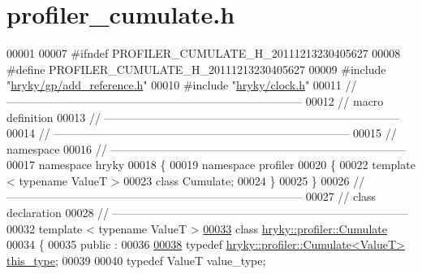 \hypertarget{profiler__cumulate_8h_source}{\section{profiler\-\_\-cumulate.\-h}
}

\begin{DoxyCode}
00001 
00007 \textcolor{preprocessor}{#ifndef PROFILER\_CUMULATE\_H\_20111213230405627}
00008 \textcolor{preprocessor}{}\textcolor{preprocessor}{#define PROFILER\_CUMULATE\_H\_20111213230405627}
00009 \textcolor{preprocessor}{}\textcolor{preprocessor}{#include "\hyperlink{add__reference_8h}{hryky/gp/add_reference.h}"}
00010 \textcolor{preprocessor}{#include "\hyperlink{clock_8h}{hryky/clock.h}"}
00011 \textcolor{comment}{//
      ------------------------------------------------------------------------------}
00012 \textcolor{comment}{// macro definition}
00013 \textcolor{comment}{//
      ------------------------------------------------------------------------------}
00014 \textcolor{comment}{//
      ------------------------------------------------------------------------------}
00015 \textcolor{comment}{// namespace}
00016 \textcolor{comment}{//
      ------------------------------------------------------------------------------}
00017 \textcolor{keyword}{namespace }hryky
00018 \{
00019 \textcolor{keyword}{namespace }profiler
00020 \{
00022     \textcolor{keyword}{template} < \textcolor{keyword}{typename} ValueT >
00023     \textcolor{keyword}{class }Cumulate;
00024 \}
00025 \}
00026 \textcolor{comment}{//
      ------------------------------------------------------------------------------}
00027 \textcolor{comment}{// class declaration}
00028 \textcolor{comment}{//
      ------------------------------------------------------------------------------}
00032 \textcolor{comment}{}\textcolor{keyword}{template} < \textcolor{keyword}{typename} ValueT >
\hypertarget{profiler__cumulate_8h_source_l00033}{}\hyperlink{classhryky_1_1profiler_1_1_cumulate}{00033} \textcolor{keyword}{class }\hyperlink{classhryky_1_1profiler_1_1_cumulate}{hryky::profiler::Cumulate}
00034 \{
00035 \textcolor{keyword}{public} :
00036 
\hypertarget{profiler__cumulate_8h_source_l00038}{}\hyperlink{classhryky_1_1profiler_1_1_cumulate_a940a94f3263b46fa9073b0e99561f39d}{00038}     \textcolor{keyword}{typedef} \hyperlink{classhryky_1_1profiler_1_1_cumulate}{hryky::profiler::Cumulate<ValueT>} \hyperlink{classhryky_1_1profiler_1_1_cumulate_a940a94f3263b46fa9073b0e99561f39d}{this_type};
00039 
00040     \textcolor{keyword}{typedef} ValueT                                  value\_type;

\end{DoxyCode}

